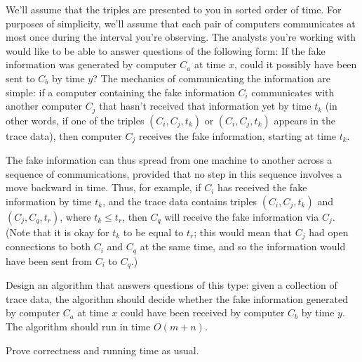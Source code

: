 \documentclass[letterpaper, 11pt]{article}
\begin{document}
We'll assume that the triples are presented to you in sorted order of
time. For purposes of simplicity, we'll assume that each pair of computers
communicates at most once during the interval you're observing.
The analysts you're working with would like to be able to
answer questions of the following form: If the fake information was generated by
computer $C_a$ at time $x$, could it possibly have been sent to $C_b$ by
time $y$? The mechanics of communicating the information are simple: if a computer containing the fake information
$C_i$ communicates with another computer $C_j$ that hasn't received that information yet by time $t_k$ (in other
words, if one of the triples $(C_i, C_j, t_k)$ or $(C_i, C_j, t_k)$ appears in the trace data), then computer $C_j$ receives the fake information, starting at time $t_k$.

The fake information can thus spread from one machine to another across a sequence
of communications, provided that no step in this sequence involves a
move backward in time. Thus, for example, if $C_i$ has received the fake information by time $t_k$,
and the trace data contains triples $(C_i, C_j, t_k)$ and $(C_j, C_q, t_r)$, where $t_k \leq t_r$,
then $C_q$ will receive the fake information via $C_j$. (Note that it is okay for $t_k$ to be equal
to $t_r$; this would mean that $C_j$ had open connections to both $C_i$ and $C_q$ at
the same time, and so the information would have been sent from $C_i$ to $C_q$.)


Design an algorithm that answers questions of this type: given a
collection of trace data, the algorithm should decide whether the fake information generated by computer $C_a$ at time $x$ could have been received by computer $C_b$ by time $y$. The algorithm should run in time $O(m + n)$.

Prove correctness and running time as usual. 


\end{document}
